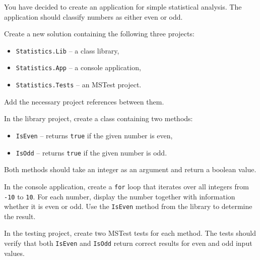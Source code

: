 \documentclass[11pt,a4paper,addpoints]{exam}
\begin{document}
\cellwidth{2.75cm}
\noindent \gradetable[h]

\vspace{0.8cm}

You have decided to create an application for simple statistical analysis.
The application should classify numbers as either even or odd.

\begin{questions}

\question[5]
Create a new solution containing the following three projects:

\begin{itemize}
    \item \texttt{Statistics.Lib} -- a class library,
    \item \texttt{Statistics.App} -- a console application,
    \item \texttt{Statistics.Tests} -- an MSTest project.
\end{itemize}

Add the necessary project references between them.

In the library project, create a class containing two methods:

\begin{itemize}
    \item \texttt{IsEven} -- returns \texttt{true} if the given number is even,
    \item \texttt{IsOdd} -- returns \texttt{true} if the given number is odd.
\end{itemize}

Both methods should take an integer as an argument and return a boolean value.

In the console application, create a \texttt{for} loop that iterates over all integers from \texttt{-10} to \texttt{10}.
For each number, display the number together with information whether it is even or odd.
Use the \texttt{IsEven} method from the library to determine the result.

In the testing project, create two MSTest tests for each method.
The tests should verify that both \texttt{IsEven} and \texttt{IsOdd} return correct results for even and odd input values.

\end{questions}
\end{document}
